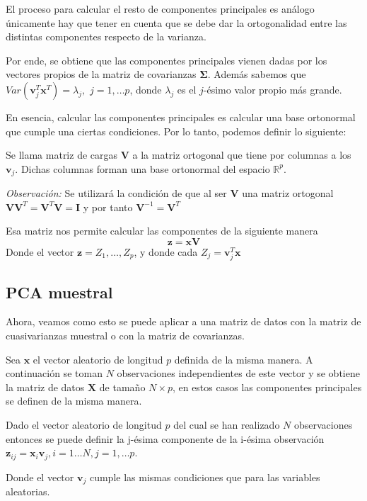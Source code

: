 \noindent El proceso para calcular el resto de componentes principales es análogo únicamente hay que tener en cuenta que se debe dar la ortogonalidad entre las distintas componentes respecto de la varianza. 

\noindent Por ende, se obtiene que las componentes principales vienen dadas por los vectores propios de la matriz de covarianzas $\mathbf{\Sigma} $. Además sabemos que $Var(\mathbf{v}_j^T \mathbf{x}^T)=\lambda_j,$ $ j=1,\ldots p$, donde $\lambda_j$ es el $j$-ésimo valor propio más grande. 

\noindent En esencia, calcular las componentes principales es calcular una base ortonormal que cumple una ciertas condiciones. Por lo tanto, podemos definir lo siguiente: 
\begin{defi}
Se llama matriz de cargas $\mathbf{V}$ a la matriz ortogonal que tiene por columnas a los $\mathbf{v}_j$. Dichas columnas forman una base ortonormal del espacio $\mathbb{R}^p$.
\end{defi}

\noindent \emph{Observación: }Se utilizará la condición de que al ser $\mathbf{V}$ una matriz ortogonal $\mathbf{VV}^T=\mathbf{V}^T\mathbf{V}=\mathbf{I}$ y por tanto $\mathbf{V}^{-1}=\mathbf{V}^T$

\noindent Esa matriz nos permite calcular las componentes de la siguiente manera
\begin{equation}
\mathbf{z}=\mathbf{x} \mathbf{V}
\end{equation} 
\noindent Donde el vector $\mathbf{z}=Z_1,\ldots, Z_p$, y donde cada $Z_j=\mathbf{v}_j^T\mathbf{x}$
\subsection{PCA muestral}
\noindent Ahora, veamos como esto se puede aplicar a una matriz de datos con la matriz de cuasivarianzas muestral o con la matriz de covarianzas. 

\noindent Sea $\mathbf{x}$ el vector aleatorio de longitud $p$ definida de la misma manera. A continuación se toman $N$ observaciones independientes de este vector y se obtiene la matriz de datos $\mathbf{X}$ de tamaño $N\times p$, en estos casos las componentes principales se definen de la misma manera. 



\begin{defi}
Dado el vector aleatorio de longitud $p$ del cual se han realizado $N$ observaciones entonces se puede definir la j-ésima componente de la i-ésima  observación $\mathbf{z}_{ij}=\mathbf{x}_i\mathbf{v}_j, i=1\ldots N,j=1,\ldots p$. 

\noindent Donde el vector $\mathbf{v}_j$ cumple las mismas condiciones que para las variables aleatorias. 
\end{defi}

